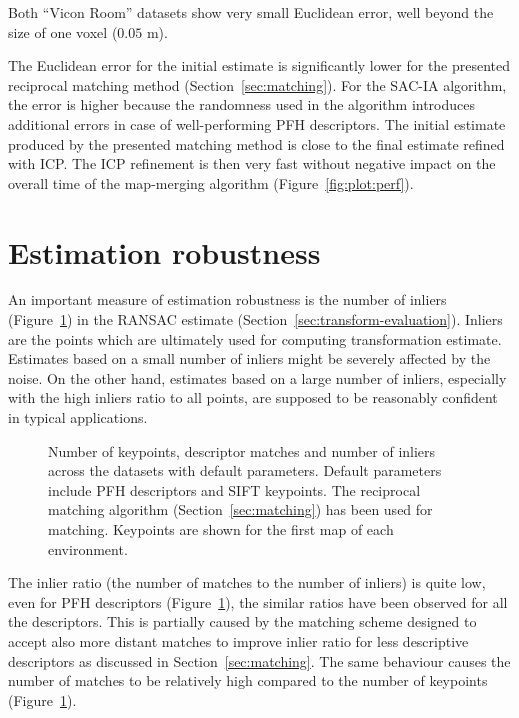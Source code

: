 Both ``Vicon Room'' datasets show very small Euclidean error, well beyond the size of one voxel ($0.05$ m).

The Euclidean error for the initial estimate is significantly lower for the presented reciprocal matching method (Section~\ref{sec:matching}). For the \gls{SAC-IA} algorithm, the error is higher because the randomness used in the algorithm introduces additional errors in case of well-performing \gls{PFH} descriptors. The initial estimate produced by the presented matching method is close to the final estimate refined with \gls{ICP}. The \gls{ICP} refinement is then very fast without negative impact on the overall time of the map-merging algorithm (Figure~\ref{fig:plot:perf}).

\section{Estimation robustness}

An important measure of estimation robustness is the number of inliers (Figure~\ref{fig:plot:inliers}) in the \gls{RANSAC} estimate (Section~\ref{sec:transform-evaluation}). Inliers are the points which are ultimately used for computing transformation estimate. Estimates based on a small number of inliers might be severely affected by the noise. On the other hand, estimates based on a large number of inliers, especially with the high inliers ratio to all points, are supposed to be reasonably confident in typical applications.

\begin{figure}
  \centering
  
  \caption[Number of keypoints, matches and inliers for aerial datasets]{Number of keypoints, descriptor matches and number of inliers across the datasets with default parameters. Default parameters include \gls{PFH} descriptors and \gls{SIFT} keypoints. The reciprocal matching algorithm (Section~\ref{sec:matching}) has been used for matching. Keypoints are shown for the first map of each environment.}
  \label{fig:plot:inliers}
\end{figure}

The inlier ratio (the number of matches to the number of inliers) is quite low, even for \gls{PFH} descriptors (Figure~\ref{fig:plot:inliers}), the similar ratios have been observed for all the descriptors. This is partially caused by the matching scheme designed to accept also more distant matches to improve inlier ratio for less descriptive descriptors as discussed in Section~\ref{sec:matching}. The same behaviour causes the number of matches to be relatively high compared to the number of keypoints (Figure~\ref{fig:plot:inliers}).

